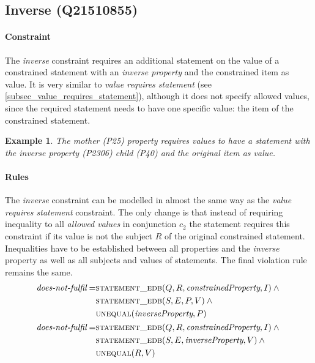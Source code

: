 \documentclass[hyperref,bachelorofscience,fleqn]{cgvpub}
\newtheorem{example}{Example}
\begin{document}
\subsection{Inverse (Q21510855)}\label{subsec_2_inverse}
\paragraph{Constraint}
The \emph{inverse} constraint requires an additional statement on the value of a constrained statement with an \emph{inverse property} and the constrained item as value. It is very similar to \emph{value requires statement} (see \ref{subsec_value_requires_statement}), although it does not specify allowed values, since the required statement needs to have one specific value: the item of the constrained statement.

\begin{example}
The \emph{mother} (P25) property requires values to have a statement with the \emph{inverse property} (P2306) \emph{child} (P40) and the original item as value.
\end{example}

\paragraph{Rules}
The \emph{inverse} constraint can be modelled in almost the same way as the \emph{value requires statement} constraint. The only change is that instead of requiring inequality to all \emph{allowed values} in conjunction \(c_2\) the statement requires this constraint if its value is not the subject \(R\) of the original constrained statement. Inequalities have to be established between all properties and the \emph{inverse} property as well as all subjects and values of statements. The final violation rule remains the same.
\begin{align}
\begin{split}
\emph{does-not-fulfil} = &\textsc{statement\_edb}(Q, R, \emph{constrainedProperty}, I) \wedge{} \\
&\textsc{statement\_edb}(S, E, P, V) \wedge{} \\
&\textsc{unequal}(\emph{inverseProperty}, P)
\end{split}\\
\begin{split}
\emph{does-not-fulfil} = &\textsc{statement\_edb}(Q, R, \emph{constrainedProperty}, I) \wedge{} \\
&\textsc{statement\_edb}(S, E, \emph{inverseProperty}, V) \wedge{} \\
&\textsc{unequal}(R, V)
\end{split}
\end{align}
\end{document}
